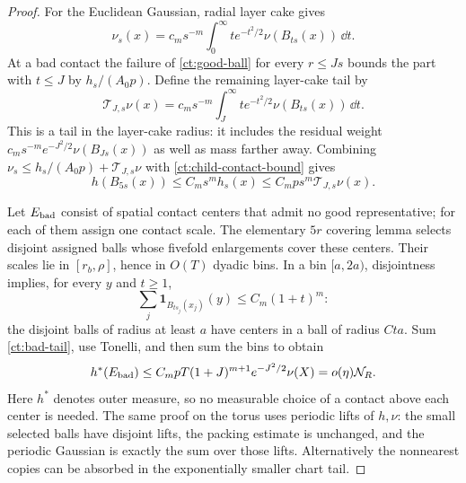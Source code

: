 \begin{proof}
For the Euclidean Gaussian, radial layer cake gives
\[
 \nu_s(x)=c_ms^{-m}\int_0^\infty
                  t e^{-t^2/2}\nu(B_{ts}(x))\,\dd t.
\]
At a bad contact the failure of \eqref{ct:good-ball} for every
$r\le Js$ bounds the part with $t\le J$ by $h_s/(A_0p)$.
Define the remaining layer-cake tail by
\[
 \mathcal T_{J,s}\nu(x)=c_ms^{-m}\int_J^\infty
                   t e^{-t^2/2}\nu(B_{ts}(x))\,\dd t.
\]
This is a tail in the layer-cake radius: it includes the residual
weight $c_ms^{-m}e^{-J^2/2}\nu(B_{Js}(x))$ as well as mass farther
away.  Combining
$\nu_s\le h_s/(A_0p)+\mathcal T_{J,s}\nu$ with
\eqref{ct:child-contact-bound} gives
\begin{equation}\label{ct:bad-tail}
 h(B_{5s}(x))\le C_m s^m h_s(x)
              \le C_mp s^m\mathcal T_{J,s}\nu(x).
\end{equation}

Let $E_{\rm bad}$ consist of spatial contact centers that admit no
good representative; for each of them assign one contact scale.
The elementary $5r$ covering lemma selects disjoint assigned balls
whose fivefold enlargements cover these centers.  Their scales lie in
$[r_b,\rho]$, hence in $O(T)$ dyadic bins.  In a bin $[a,2a)$,
disjointness implies, for every $y$ and $t\ge1$,
\[
 \sum_j\mathbf1_{B_{ts_j}(x_j)}(y)\le C_m(1+t)^m:
\]
the disjoint balls of radius at least $a$ have centers in a ball of
radius $Cta$.  Sum \eqref{ct:bad-tail}, use Tonelli, and then sum the
bins to obtain
\begin{equation}\label{ct:bad-total}
 h^*(E_{\rm bad})
 \le C_mpT(1+J)^{m+1}e^{-J^2/2}\nu(X)
 =o(\eta)\mathcal N_R.
\end{equation}
Here $h^*$ denotes outer measure, so no measurable choice of a contact
above each center is needed.  The same proof on the torus uses periodic
lifts of $h,\nu$: the small selected balls have disjoint lifts, the
packing estimate is unchanged, and the periodic Gaussian is exactly
the sum over those lifts.  Alternatively the nonnearest copies can be
absorbed in the exponentially smaller chart tail.


\end{proof}
